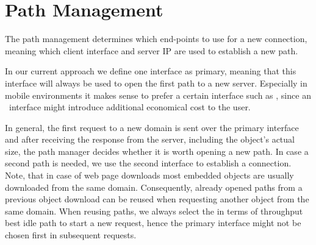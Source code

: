 \section{Path Management}
\label{sec:path-management}


The path management determines which end-points to use for a new connection, meaning which client interface and server IP are used to establish a new path. 

In our current approach we define one interface as primary, meaning that this interface will always be used to open the first path to a new server. 
Especially in mobile environments it makes sense to prefer a certain interface such as \wifi, since an \lte~interface might introduce additional economical cost to the user. 

In general, the first request to a new domain is sent over the primary interface and after receiving the response from the server, including the object's actual size, the path manager decides whether it is worth opening a new path. 
In case a second path is needed, we use the second interface to establish a connection. 
Note, that in case of web page downloads most embedded objects are usually downloaded from the same domain. 
Consequently, already opened paths from a previous object download can be reused when requesting another object from the same domain. 
When reusing paths, we always select the in terms of throughput best idle path to start a new request, hence the primary interface might not be chosen first in subsequent requests.

